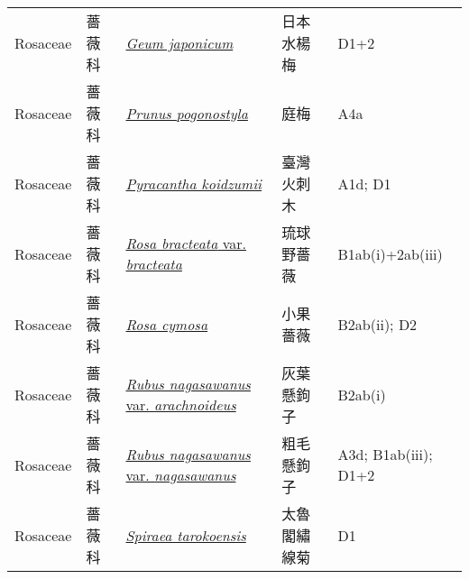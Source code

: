 {\begin{longtable}{L{2.5cm}L{2cm}L{5cm}L{2.5cm}L{3cm}}
    Rosaceae & 薔薇科 & \href{http://www.theplantlist.org/tpl1.1/search?q=Geum+japonicum}{\textit{Geum japonicum} } & 日本水楊梅 & D1+2    \\
    Rosaceae & 薔薇科 & \href{http://www.theplantlist.org/tpl1.1/search?q=Prunus+pogonostyla}{\textit{Prunus pogonostyla} } & 庭梅 & A4a    \\
    Rosaceae & 薔薇科 & \href{http://www.theplantlist.org/tpl1.1/search?q=Pyracantha+koidzumii}{\textit{Pyracantha koidzumii} } & 臺灣火刺木 & A1d; D1    \\
    Rosaceae & 薔薇科 & \href{http://www.theplantlist.org/tpl1.1/search?q=Rosa+bracteata+var.+bracteata}{\textit{Rosa bracteata} var. \textit{bracteata} } & 琉球野薔薇 & B1ab(i)+2ab(iii)    \\
    Rosaceae & 薔薇科 & \href{http://www.theplantlist.org/tpl1.1/search?q=Rosa+cymosa}{\textit{Rosa cymosa} } & 小果薔薇 & B2ab(ii); D2    \\
    Rosaceae & 薔薇科 & \href{http://www.theplantlist.org/tpl1.1/search?q=Rubus+nagasawanus+var.+arachnoideus}{\textit{Rubus nagasawanus} var. \textit{arachnoideus} } & 灰葉懸鉤子 & B2ab(i)    \\
    Rosaceae & 薔薇科 & \href{http://www.theplantlist.org/tpl1.1/search?q=Rubus+nagasawanus+var.+nagasawanus}{\textit{Rubus nagasawanus} var. \textit{nagasawanus} } & 粗毛懸鉤子 & A3d; B1ab(iii); D1+2    \\
    Rosaceae & 薔薇科 & \href{http://www.theplantlist.org/tpl1.1/search?q=Spiraea+tarokoensis}{\textit{Spiraea tarokoensis} } & 太魯閣繡線菊 & D1    \\

\end{longtable}}
